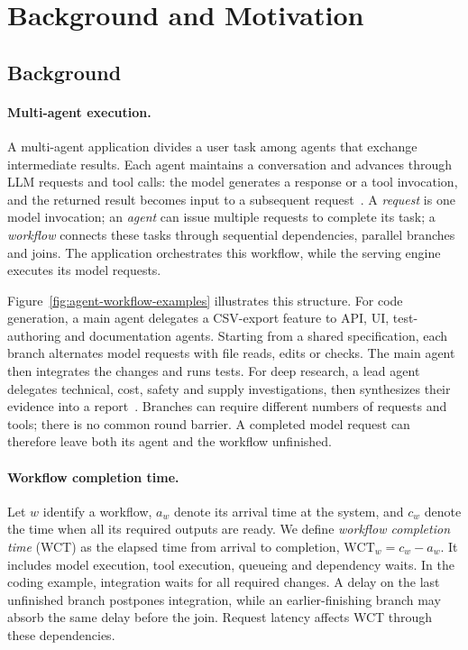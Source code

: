 \section{Background and Motivation}
\label{sec:background-motivation}

\subsection{Background}
\label{sec:motivation-background}

\paragraph{Multi-agent execution.}
A multi-agent application divides a user task among agents that exchange
intermediate results. Each agent maintains a conversation and advances
through LLM requests and tool calls: the model generates a response or
a tool invocation, and the returned result becomes input to a subsequent
request~\cite{wu2023autogen}. A \emph{request} is one model invocation;
an \emph{agent} can issue multiple requests to complete its task; a
\emph{workflow} connects these tasks through sequential dependencies,
parallel branches and joins. The application orchestrates this workflow,
while the serving engine executes its model requests.

Figure~\ref{fig:agent-workflow-examples} illustrates this structure.
For code generation, a main agent delegates a CSV-export feature to API,
UI, test-authoring and documentation agents. Starting from a shared
specification, each branch alternates model requests with file reads,
edits or checks. The main agent then integrates the changes and runs
tests. For deep research, a lead agent delegates technical, cost, safety
and supply investigations, then synthesizes their evidence into a
report~\cite{anthropic2025multiagent}. Branches can require different
numbers of requests and tools; there is no common round barrier.
A completed model request can therefore leave both its agent and the
workflow unfinished.

\paragraph{Workflow completion time.}
Let $w$ identify a workflow, $a_w$ denote its arrival time at the system,
and $c_w$ denote the time when all its required outputs are ready.
We define \emph{workflow completion time} (WCT) as the elapsed time from
arrival to completion, $\mathrm{WCT}_w=c_w-a_w$.
It includes model execution, tool execution,
queueing and dependency waits. In the coding example, integration waits
for all required changes. A delay on the last unfinished branch postpones
integration, while an earlier-finishing branch may absorb the same delay
before the join. Request latency affects WCT through these dependencies.

